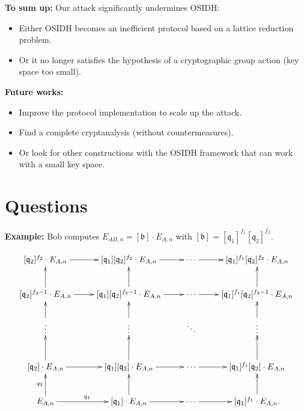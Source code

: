 \documentclass[10pt]{beamer}
\theoremstyle{plain}
\theoremstyle{definition}
\renewcommand{\(}{\left(}
\renewcommand{\)}{\right)}
\newcommand{\mf}[1]{\mathfrak{#1}}
\begin{document}
\begin{frame}
\textbf{To sum up:} Our attack significantly undermines OSIDH:

\vspace{0.3cm}

\begin{itemize}
\item Either OSIDH becomes an inefficient protocol based on a lattice reduction problem.

\item Or it no longer satisfies the hypothesis of a cryptographic group action (key space too small).

\end{itemize}

\vspace{0.5cm}
\pause 

\textbf{Future works:}

\vspace{0.3cm}

\begin{itemize}
\item Improve the protocol implementation to scale up the attack.

\item Find a complete cryptanalysis (without countermeasures).

\item Or look for other constructions with the OSIDH framework that can work with a small key space. 
\end{itemize}
\end{frame}

\appendix

\section{Questions}

\begin{frame}
\textbf{Example:} Bob computes $E_{AB,n}=[\mf{b}]\cdot E_{A,n}$ with $[\mf{b}]=[\mf{q}_1]^{f_1}[\mf{q}_2]^{f_2}$.

\[\xymatrix{
[\mf{q}_2]^{f_2}\cdot E_{A,n}  \ar[r] & [\mf{q}_1][\mf{q}_2]^{f_2}\cdot E_{A,n} \ar[r] & \cdots \ar[r] & [\mf{q}_1]^{f_1}[\mf{q}_2]^{f_2}\cdot E_{A,n}\\
[\mf{q}_2]^{f_2-1}\cdot E_{A,n}  \ar[u] \ar[r] & [\mf{q}_1][\mf{q}_2]^{f_2-1}\cdot E_{A,n} \ar[u] \ar[r] & \cdots \ar[r] & [\mf{q}_1]^{f_1}[\mf{q}_2]^{f_2-1}\cdot E_{A,n}\ar[u]\\
\vdots \ar[u] & \vdots \ar[u] & \ddots & \vdots \ar[u]\\
[\mf{q}_2]\cdot E_{A,n}  \ar[u] \ar[r] & [\mf{q}_1][\mf{q}_2]\cdot E_{A,n} \ar[u]\ar[r] & \cdots \ar[r] & [\mf{q}_1]^{f_1}[\mf{q}_2]\cdot E_{A,n} \ar[u] \\
E_{A,n} \ar[u]^{q_2} \ar[r]^{q_1} & [\mf{q}_1]\cdot E_{A,n} \ar[u] \ar[r] & \cdots  \ar[r] & [\mf{q}_1]^{f_1}\cdot E_{A,n}. \ar[u]
}\]

\end{frame}
\end{document}
